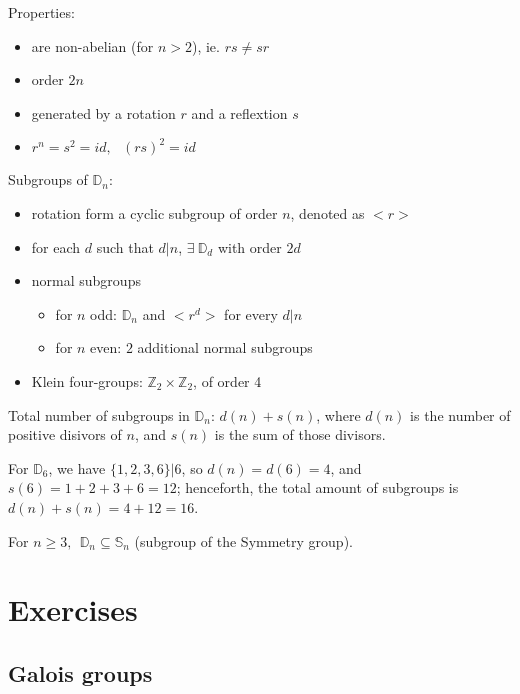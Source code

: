 \documentclass{article}
\theoremstyle{definition}
\newenvironment{eg}[1]
{\renewcommand\theinnereg{#1}\innereg}
{\endinnereg}
\begin{document}
Properties:
\begin{itemize}
  \item are non-abelian (for $n>2$), ie. $rs \neq sr$
  \item order $2n$
  \item generated by a rotation $r$ and a reflextion $s$
  \item $r^n = s^2 = id,~~~(rs)^2=id$
\end{itemize}
Subgroups of $\mathbb{D}_n$:
\begin{itemize}
  \item rotation form a cyclic subgroup of order $n$, denoted as $<r>$
  \item for each $d$ such that $d|n$, $\exists~ \mathbb{D}_d$ with order $2d$
  \item normal subgroups
    \begin{itemize}
      \item for $n$ odd: $\mathbb{D}_n$ and $<r^d>$ for every $d|n$
      \item for $n$ even: $2$ additional normal subgroups
    \end{itemize}
  \item Klein four-groups: $\mathbb{Z}_2 \times \mathbb{Z}_2$, of order 4
\end{itemize}

\vspace{0.3cm}
Total number of subgroups in $\mathbb{D}_n$: $d(n) + s(n)$, where $d(n)$ is the number of positive disivors of $n$, and $s(n)$ is the sum of those divisors.

\begin{eg}{}
For $\mathbb{D}_6$, we have $\{1,2,3,6\} | 6$, so $d(n) = d(6) = 4$, and
$s(6) = 1+2+3+6 = 12$; henceforth, the total amount of subgroups is $d(n)+s(n) = 4+12 = 16$.
\end{eg}

\vspace{0.3cm}
For $n \geq 3, ~~\mathbb{D}_n \subseteq \mathbb{S}_n$ (subgroup of the Symmetry group).



\newpage

\section{Exercises}

\subsection{Galois groups}
\end{document}
